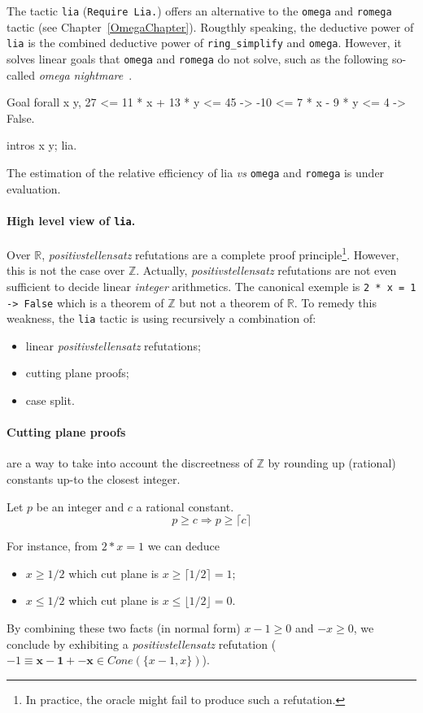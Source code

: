 \label{sec:lia}

The tactic {\tt lia} ({\tt Require Lia.}) offers an alternative to the {\tt omega} and {\tt romega} tactic (see
Chapter~\ref{OmegaChapter}). 
%
Rougthly speaking, the deductive power of {\tt lia} is the combined deductive power of {\tt ring\_simplify} and {\tt omega}.
%
However, it solves linear goals that {\tt omega} and {\tt romega} do not solve, such as the
following so-called \emph{omega nightmare}~\cite{TheOmegaPaper}.
\begin{coq_example*}
Goal forall x y,
  27 <= 11 * x + 13 * y <= 45 ->
  -10 <= 7 * x - 9 * y <= 4 ->  False.
\end{coq_example*}
\begin{coq_eval}
intros x y; lia.
\end{coq_eval}
The estimation of the relative efficiency of lia \emph{vs} {\tt omega}
and {\tt romega} is under evaluation.

\paragraph{High level view of {\tt lia}.}
Over $\mathbb{R}$,  \emph{positivstellensatz} refutations are a complete proof principle\footnote{In practice, the oracle might fail to produce such a refutation.}.
%
However, this is not the case over $\mathbb{Z}$.
%
Actually, \emph{positivstellensatz} refutations are not even sufficient to decide linear \emph{integer} 
arithmetics.
%
The canonical exemple is {\tt 2 * x = 1 -> False} which is a theorem of $\mathbb{Z}$ but not a theorem of $\mathbb{R}$.
%
To remedy this weakness, the {\tt lia} tactic is using recursively a combination of:
%
\begin{itemize}
\item linear \emph{positivstellensatz} refutations;
\item cutting plane proofs;
\item case split.
\end{itemize}

\paragraph{Cutting plane proofs} are a way to take into account the discreetness of $\mathbb{Z}$ by rounding up
(rational) constants up-to the closest integer. 
%
\begin{theorem}
  Let $p$ be an integer and $c$ a rational constant.
  \[
  p \ge c \Rightarrow p \ge \lceil c \rceil
  \]
\end{theorem}
For instance, from $2 * x = 1$ we can deduce 
\begin{itemize}
\item $x \ge 1/2$ which cut plane is $ x \ge \lceil 1/2 \rceil = 1$;
\item $ x \le 1/2$ which cut plane is $ x \le \lfloor 1/2 \rfloor = 0$.
\end{itemize}
By combining these two facts (in normal form) $x - 1 \ge 0$ and $-x \ge 0$, we conclude by exhibiting a
\emph{positivstellensatz} refutation ($-1 \equiv \mathbf{x-1} + \mathbf{-x}  \in Cone(\{x-1,x\})$).

